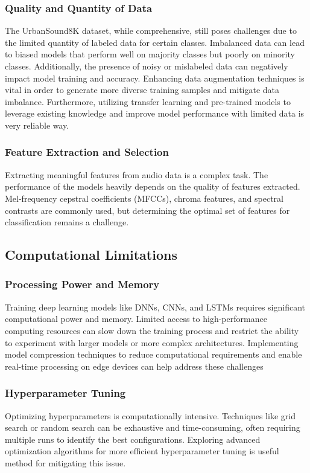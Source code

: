 \documentclass[conference]{IEEEtran}
\begin{document}
\subsubsection{Quality and Quantity of Data}
The UrbanSound8K dataset, while comprehensive, still poses challenges due to the limited quantity of labeled data for certain classes. Imbalanced data can lead to biased models that perform well on majority classes but poorly on minority classes. Additionally, the presence of noisy or mislabeled data can negatively impact model training and accuracy. Enhancing data augmentation techniques is vital in order to generate more diverse training samples and mitigate data imbalance. Furthermore, utilizing transfer learning and pre-trained models to leverage existing knowledge and improve model performance with limited data is very reliable way.

\subsubsection{Feature Extraction and Selection}
Extracting meaningful features from audio data is a complex task. The performance of the models heavily depends on the quality of features extracted. Mel-frequency cepstral coefficients (MFCCs), chroma features, and spectral contrasts are commonly used, but determining the optimal set of features for classification remains a challenge.

\subsection{Computational Limitations}

\subsubsection{Processing Power and Memory}
Training deep learning models like DNNs, CNNs, and LSTMs requires significant computational power and memory. Limited access to high-performance computing resources can slow down the training process and restrict the ability to experiment with larger models or more complex architectures. Implementing model compression techniques to reduce computational requirements and enable real-time processing on edge devices can help address these challenges

\subsubsection{Hyperparameter Tuning}
Optimizing hyperparameters is computationally intensive. Techniques like grid search or random search can be exhaustive and time-consuming, often requiring multiple runs to identify the best configurations. Exploring advanced optimization algorithms for more
efficient hyperparameter tuning is useful method for mitigating this issue.
\end{document}
